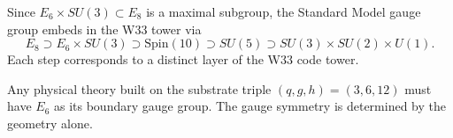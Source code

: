 \begin{corollary}
Since $E_6\times SU(3)\subset E_8$ is a maximal subgroup,
the Standard Model gauge group embeds in the W33 tower via
\[
E_8\supset E_6\times SU(3)\supset\mathrm{Spin}(10)\supset SU(5)
\supset SU(3)\times SU(2)\times U(1).
\]
Each step corresponds to a distinct layer of the W33 code tower.
\end{corollary}

\begin{corollary}[Universality]
Any physical theory built on the substrate triple $(q,g,h)=(3,6,12)$
must have $E_6$ as its boundary gauge group.
The gauge symmetry is determined by the geometry alone.
\end{corollary}
